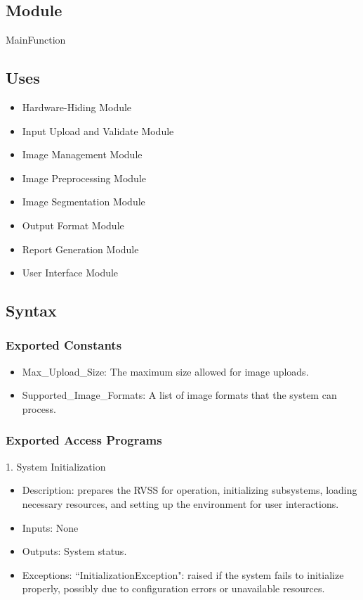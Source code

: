 \documentclass[12pt, titlepage]{article}
\begin{document}
\subsection{Module}
MainFunction

\subsection{Uses}

\begin{itemize}
    \item Hardware-Hiding Module
    \item Input Upload and Validate Module
    \item Image Management Module
    \item Image Preprocessing Module
    \item Image Segmentation Module
    \item Output Format Module
    \item Report Generation Module
    \item User Interface Module
\end{itemize}

\subsection{Syntax}

\subsubsection{Exported Constants}
\begin{itemize}
    \item Max\_Upload\_Size: The maximum size allowed for image uploads.
    \item Supported\_Image\_Formats: A list of image formats that the system can process.
\end{itemize}

\subsubsection{Exported Access Programs}
1. System Initialization
\begin{itemize}
    \item Description: prepares the RVSS for operation, initializing subsystems, loading necessary resources, and setting up the environment for user interactions.
    \item Inputs: None
    \item Outputs: System status.
    \item Exceptions: ``InitializationException": raised if the system fails to initialize properly, possibly due to configuration errors or unavailable resources.
\end{itemize}
\end{document}
